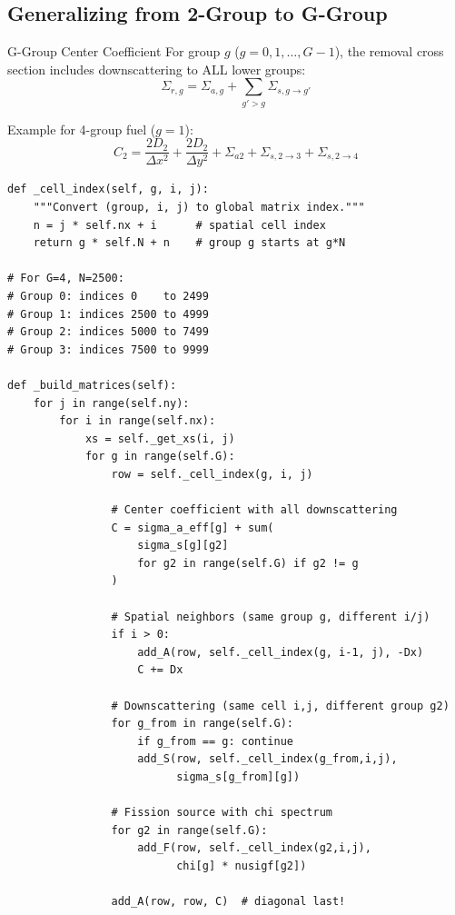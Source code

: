 \documentclass[12pt,a4paper]{article}
\begin{document}
\subsection{Generalizing from 2-Group to G-Group}

\begin{physicsbox}{G-Group Center Coefficient}
For group $g$ ($g = 0, 1, \ldots, G-1$), the removal cross section includes
downscattering to ALL lower groups:
\begin{equation}
\Sigma_{r,g} = \Sigma_{a,g} + \sum_{g' > g} \Sigma_{s,g \to g'}
\end{equation}

Example for 4-group fuel ($g=1$):
\begin{equation}
C_2 = \frac{2D_2}{\Delta x^2} + \frac{2D_2}{\Delta y^2}
      + \Sigma_{a2} + \Sigma_{s,2\to3} + \Sigma_{s,2\to4}
\end{equation}
\end{physicsbox}

\begin{lstlisting}[caption={G-Group Cell Index and Matrix Assembly}]
def _cell_index(self, g, i, j):
    """Convert (group, i, j) to global matrix index."""
    n = j * self.nx + i      # spatial cell index
    return g * self.N + n    # group g starts at g*N

# For G=4, N=2500:
# Group 0: indices 0    to 2499
# Group 1: indices 2500 to 4999
# Group 2: indices 5000 to 7499
# Group 3: indices 7500 to 9999

def _build_matrices(self):
    for j in range(self.ny):
        for i in range(self.nx):
            xs = self._get_xs(i, j)
            for g in range(self.G):
                row = self._cell_index(g, i, j)

                # Center coefficient with all downscattering
                C = sigma_a_eff[g] + sum(
                    sigma_s[g][g2]
                    for g2 in range(self.G) if g2 != g
                )

                # Spatial neighbors (same group g, different i/j)
                if i > 0:
                    add_A(row, self._cell_index(g, i-1, j), -Dx)
                    C += Dx

                # Downscattering (same cell i,j, different group g2)
                for g_from in range(self.G):
                    if g_from == g: continue
                    add_S(row, self._cell_index(g_from,i,j),
                          sigma_s[g_from][g])

                # Fission source with chi spectrum
                for g2 in range(self.G):
                    add_F(row, self._cell_index(g2,i,j),
                          chi[g] * nusigf[g2])

                add_A(row, row, C)  # diagonal last!
\end{lstlisting}
\end{document}
